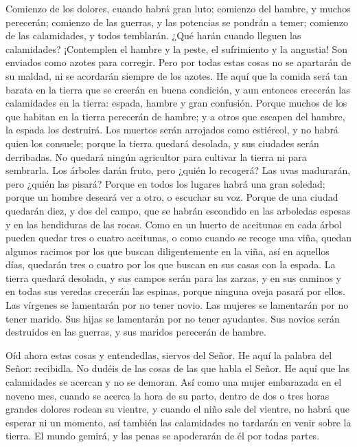  Comienzo de los dolores, cuando habrá gran luto;
comienzo del hambre, y muchos perecerán; comienzo de las guerras, y las
potencias se pondrán a temer; comienzo de las calamidades, y todos
temblarán. ¿Qué harán cuando lleguen las calamidades? 
¡Contemplen el hambre y la peste, el sufrimiento y la angustia! Son
enviados como azotes para corregir.  Pero por todas estas
cosas no se apartarán de su maldad, ni se acordarán siempre de los
azotes.  He aquí que la comida será tan barata en la
tierra que se creerán en buena condición, y aun entonces crecerán las
calamidades en la tierra: espada, hambre y gran confusión.
 Porque muchos de los que habitan en la tierra perecerán
de hambre; y a otros que escapen del hambre, la espada los destruirá.
 Los muertos serán arrojados como estiércol, y no habrá
quien los consuele; porque la tierra quedará desolada, y sus ciudades
serán derribadas.  No quedará ningún agricultor para
cultivar la tierra ni para sembrarla.  Los árboles darán
fruto, pero ¿quién lo recogerá?  Las uvas madurarán, pero
¿quién las pisará? Porque en todos los lugares habrá una gran soledad;
 porque un hombre deseará ver a otro, o escuchar su voz.
 Porque de una ciudad quedarán diez, y dos del campo, que
se habrán escondido en las arboledas espesas y en las hendiduras de las
rocas.  Como en un huerto de aceitunas en cada árbol
pueden quedar tres o cuatro aceitunas,  o como cuando se
recoge una viña, quedan algunos racimos por los que buscan
diligentemente en la viña,  así en aquellos días,
quedarán tres o cuatro por los que buscan en sus casas con la espada.
 La tierra quedará desolada, y sus campos serán para las
zarzas, y en sus caminos y en todas sus veredas crecerán las espinas,
porque ninguna oveja pasará por ellos.  Las vírgenes se
lamentarán por no tener novio. Las mujeres se lamentarán por no tener
marido. Sus hijas se lamentarán por no tener ayudantes. 
Sus novios serán destruidos en las guerras, y sus maridos perecerán de
hambre.

 Oíd ahora estas cosas y entendedlas, siervos del Señor.
 He aquí la palabra del Señor: recibidla. No dudéis de
las cosas de las que habla el Señor.  He aquí que las
calamidades se acercan y no se demoran.  Así como una
mujer embarazada en el noveno mes, cuando se acerca la hora de su parto,
dentro de dos o tres horas grandes dolores rodean su vientre, y cuando
el niño sale del vientre, no habrá que esperar ni un momento,
 así también las calamidades no tardarán en venir sobre
la tierra. El mundo gemirá, y las penas se apoderarán de él por todas
partes.

